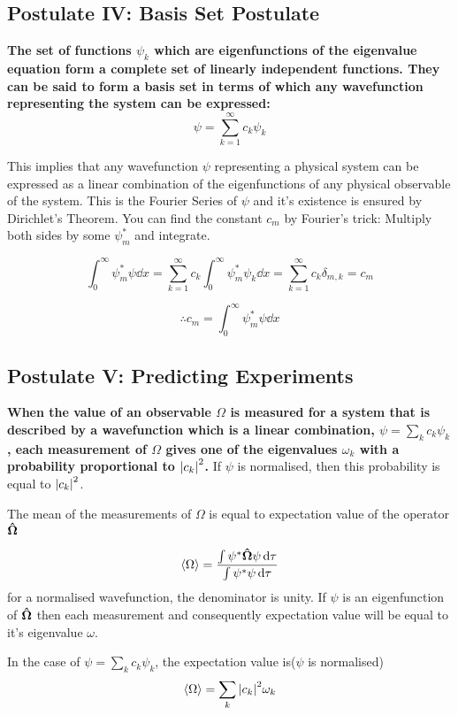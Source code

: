 \documentclass[11pt]{article}
\theoremstyle{definition}
\begin{document}
\subsection{Postulate IV: Basis Set Postulate}

\textbf{The set of functions $\psi_k$ which are eigenfunctions of the eigenvalue equation form a complete set of linearly independent functions. They can be said to form a basis set in terms of which any wavefunction representing the system can be expressed:}
\begin{equation*}
    \psi = \sum_{k=1}^{\infty} c_k \psi_k
\end{equation*}

This implies that any wavefunction $\psi$ representing a physical system can be expressed as a linear combination of the eigenfunctions of any physical observable of the system. This is the Fourier Series of $\psi$ and it's existence is ensured by Dirichlet's Theorem. You can find the constant $c_m$ by Fourier's trick: Multiply both sides by some $\psi_m^*$ and integrate.

$$\int_0 ^{\infty} \psi_m^* \psi \dd{x} = \sum_{k=1} ^{\infty} c_k\int_0 ^{\infty} \psi_m^* \psi_k \dd{x} =  \sum_{k=1} ^{\infty} c_k \delta_{m, k} = c_m$$

$$\therefore c_m = \int_0 ^{\infty} \psi_m^* \psi \dd{x} $$



\subsection{Postulate V: Predicting Experiments}
\textbf{When the value of an observable $\Omega$ is measured for a system that is described by a wavefunction which is a linear combination, $\psi = \sum_k c_k \psi_k$, each measurement of $\Omega$ gives one of the eigenvalues $\omega_k$ with a probability proportional to $\abs{c_k}^2$.}
If $\psi$ is normalised, then this probability is equal to $\abs{c_k}^2$.


\begin{shaded}
The mean of the measurements of $\Omega$ is equal to expectation value of the operator $\vectorunit{\Omega}$

\begin{equation*}
    \expval{\Omega} = \frac{\int \psi^* \vectorunit{\Omega} \psi \dd{\tau}}{\int \psi^* \psi \dd{\tau}}
\end{equation*}
for a normalised wavefunction, the denominator is unity. If $\psi$ is an eigenfunction of $\vectorunit{\Omega}$ then each measurement and consequently expectation value will be equal to it's eigenvalue $\omega$.

In the case of $\psi = \sum_{k} c_k \psi_k$, the expectation value is($\psi$ is normalised)
\begin{equation*}
    \expval{\Omega} = \sum_{k} \abs{c_k}^2 \omega_k
\end{equation*}

\end{shaded}
\end{document}
